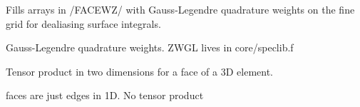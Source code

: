 Fills arrays in /\-F\-A\-C\-E\-W\-Z/ with Gauss-\/\-Legendre quadrature weights on the fine grid for dealiasing surface integrals. 

Gauss-\/\-Legendre quadrature weights. Z\-W\-G\-L lives in core/speclib.\-f

Tensor product in two dimensions for a face of a 3\-D element.

faces are just edges in 1\-D. No tensor product